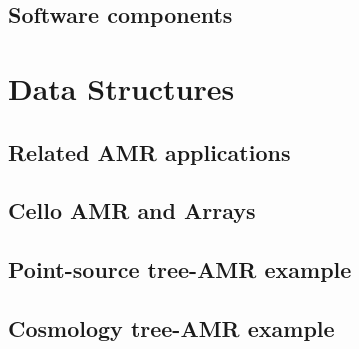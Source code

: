 \documentclass{beamer}
\begin{document}





\subsection{Software components}


% 
% 
% 
% 
% 

\section{Data Structures}

\subsection{Related AMR applications}






\subsection{Cello AMR and Arrays}





\subsection{Point-source tree-AMR example}


\subsection{Cosmology tree-AMR example}

\end{document}
